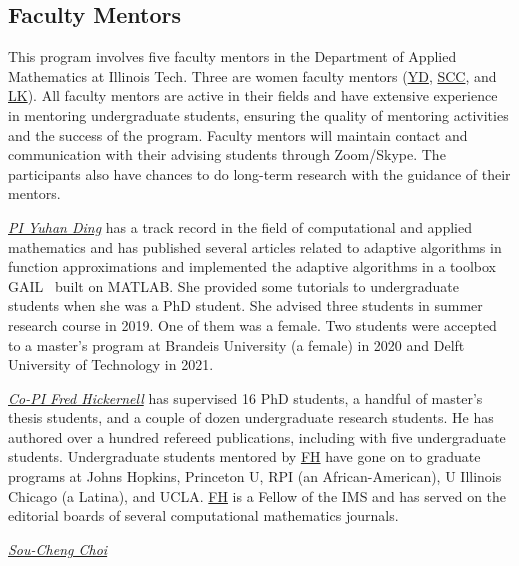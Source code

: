 \documentclass[11pt]{NSFamsart}
\newcommand{\FH}{\hyperlink{FHlink}{FH}\xspace}
\newcommand{\SCTC}{\hyperlink{SCTClink}{SCC}\xspace}
\newcommand{\YD}{\hyperlink{YDlink}{YD}\xspace}
\newcommand{\LK}{\hyperlink{LKlink}{LK}\xspace}
\begin{document}
\subsection{Faculty Mentors}
This program involves five faculty
mentors in the Department of Applied Mathematics at
Illinois Tech. Three are women faculty mentors (\YD, \SCTC, and \LK). All faculty mentors are
active in their fields and have extensive experience in mentoring undergraduate students, ensuring the quality of mentoring activities and the success of the program. 
Faculty mentors will maintain contact and communication with their advising students through Zoom/Skype. The participants also have chances to do long-term research with the guidance of their mentors.



\noindent \underline{\textit{PI Yuhan Ding}}  has a track record in the field of computational and applied
mathematics and has published several articles related to adaptive algorithms in function approximations and implemented the adaptive algorithms in a toolbox GAIL~\cite{
ChoEtal21a} built on MATLAB. She provided some tutorials to undergraduate students when she was a PhD student. She advised three students in summer research course in 2019. One of them was a female. Two students were accepted to a master's program at Brandeis University (a female) in 2020 and Delft University of Technology in 2021.

\noindent \underline{\textit{Co-PI Fred Hickernell}} has supervised 16 PhD students, a handful of master's thesis students, and a couple of dozen undergraduate research students.  He has authored over a hundred refereed publications, including \cite{ChoEtal22a,HicEtal14b,LiHic03a,SonRidFasHic10a} with five undergraduate students.  Undergraduate students mentored by \FH have gone on to graduate programs at Johns Hopkins, Princeton U, RPI (an African-American), U Illinois Chicago (a Latina), and UCLA. \FH is a Fellow of the IMS and has served on the editorial boards of several computational mathematics journals. 

\noindent\underline{\textit{Sou-Cheng Choi}} 
\end{document}
